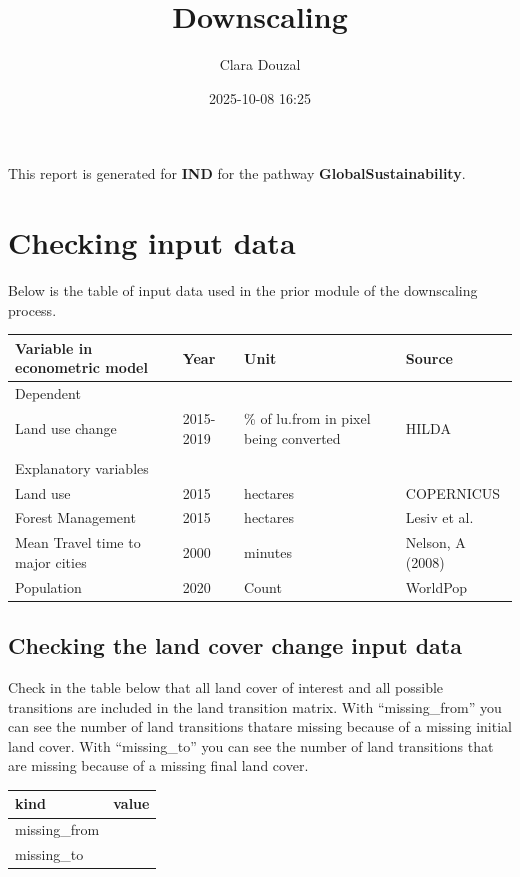 \documentclass[
]{article}
\title{Downscaling}
\author{Clara Douzal}
\date{2025-10-08 16:25}
\begin{document}
\maketitle

This report is generated for \textbf{IND} for the pathway
\textbf{GlobalSustainability}.

\section{Checking input data}\label{checking-input-data}

Below is the table of input data used in the prior module of the
downscaling process.

\begin{tabular}{l|l|l|l}
\hline
Variable in econometric model & Year & Unit & Source\\
\hline
Dependent &  &  & \\
\hline
Land use change & 2015-2019 & \% of lu.from in pixel being converted & HILDA\\
\hline
 &  &  & \\
\hline
Explanatory variables &  &  & \\
\hline
Land use & 2015 & hectares & COPERNICUS\\
\hline
Forest Management & 2015 & hectares & Lesiv et al.\\
\hline
Mean Travel time to major cities & 2000 & minutes & Nelson, A (2008)\\
\hline
Population & 2020 & Count & WorldPop\\
\hline
\end{tabular}

\subsection{Checking the land cover change input
data}\label{checking-the-land-cover-change-input-data}

Check in the table below that all land cover of interest and all
possible transitions are included in the land transition matrix. With
``missing\_from'' you can see the number of land transitions thatare
missing because of a missing initial land cover. With ``missing\_to''
you can see the number of land transitions that are missing because of a
missing final land cover.

\begin{longtable}[]{@{}ll@{}}
\toprule\noalign{}
kind & value \\
\midrule\noalign{}
\endhead
\bottomrule\noalign{}
\endlastfoot
missing\_from & \\
missing\_to & \\
\end{longtable}
\end{document}
